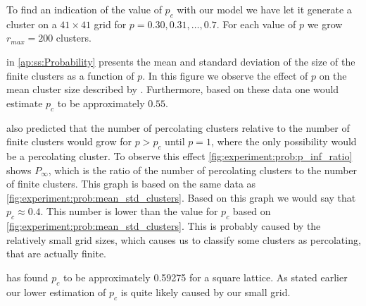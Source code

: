 To find an indication of the value of $p_c$ with our model we have let it generate a cluster on a $41 \times 41$ grid for $p = 0.30, 0.31, \dotsc, 0.7$. For each value of $p$ we grow $r_{max} = 200$ clusters. 

 in \cref{ap:ss:Probability} presents the mean and standard deviation of the size of the finite clusters as a function of $p$. In this figure we observe the effect of $p$ on the mean cluster size described by \citeauthor{kenzel1997physics}. Furthermore, based on these data one would estimate $p_c$ to be approximately $0.55$. 

\citeauthor{kenzel1997physics} also predicted that the number of percolating clusters relative to the number of finite clusters would grow for $p > p_c$ until $p = 1$, where the only possibility would be a percolating cluster. To observe this effect \cref{fig:experiment:prob:p_inf_ratio} shows $P_\infty$, which is the ratio of the number of percolating clusters to the number of finite clusters. This graph is based on the same data as \cref{fig:experiment:prob:mean_std_clusters}. Based on this graph we would say that $p_c \approx 0.4$. This number is lower than the value for $p_c$ based on \cref{fig:experiment:prob:mean_std_clusters}. This is probably caused by the relatively small grid sizes, which causes us to classify some clusters as percolating, that are actually finite. 

\textcite{stauffer1994introduction} has found $p_c$ to be approximately \num{0.59275} for a square lattice. As stated earlier our lower estimation of $p_c$ is quite likely caused by our small grid. 
